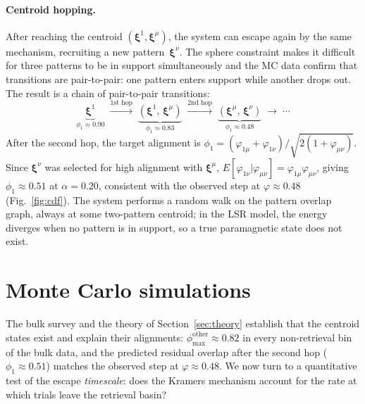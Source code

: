 \documentclass[11pt]{article}
\newcommand{\bxi}{\boldsymbol{\xi}}
\begin{document}
\paragraph{Centroid hopping.}
After reaching the centroid $(\bxi^1, \bxi^\mu)$, the system can escape again by the same mechanism, recruiting a new pattern~$\bxi^\nu$.  The sphere constraint makes it difficult for three patterns to be in support simultaneously and the MC data confirm that transitions are pair-to-pair: one pattern enters support while another drops out.  The result is a chain of pair-to-pair transitions:
\begin{equation}
\underbrace{\bxi^1}_{\phi_1 \approx 0.90}
\;\xrightarrow{\text{1st hop}}\;
\underbrace{(\bxi^1,\,\bxi^\mu)}_{\phi_1 \approx 0.83}
\;\xrightarrow{\text{2nd hop}}\;
\underbrace{(\bxi^\mu,\,\bxi^\nu)}_{\phi_1 \approx 0.48}
\;\to\; \cdots
\label{eq:hopping_chain}
\end{equation}
After the second hop, the target alignment is $\phi_1 = (\varphi_{1\mu} + \varphi_{1\nu})/\sqrt{2(1+\varphi_{\mu\nu})}$.  Since $\bxi^\nu$ was selected for high alignment with $\bxi^\mu$, $E[\varphi_{1\nu} | \varphi_{\mu\nu}] = \varphi_{1\mu}\varphi_{\mu\nu}$, giving $\phi_1 \approx 0.51$ at $\alpha = 0.20$, consistent with the observed step at $\varphi \approx 0.48$ (Fig.~\ref{fig:cdf}).  The system performs a random walk on the pattern overlap graph, always at some two-pattern centroid; in the LSR model, the energy diverges when no pattern is in support, so a true paramagnetic state does not exist.

\section{Monte Carlo simulations}
\label{sec:mc}

The bulk survey and the theory of Section~\ref{sec:theory} establish that the centroid states exist and explain their alignments: $\phi_{\max}^{\mathrm{other}} \approx 0.82$ in every non-retrieval bin of the bulk data, and the predicted residual overlap after the second hop ($\phi_1 \approx 0.51$) matches the observed step at $\varphi \approx 0.48$.  We now turn to a quantitative test of the escape \emph{timescale}: does the Kramers mechanism account for the rate at which trials leave the retrieval basin?
\end{document}
